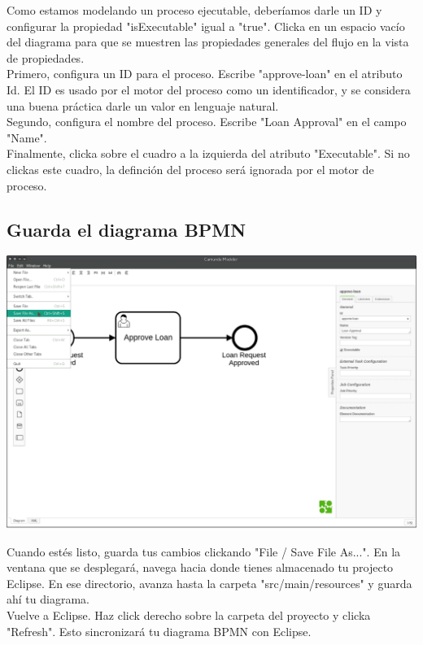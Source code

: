 \documentclass{article}
\begin{document}
Como estamos modelando un proceso ejecutable, deberíamos darle un ID y configurar la propiedad "isExecutable" igual a "true". Clicka en un espacio vacío del diagrama para que se muestren las propiedades generales del flujo en la vista de propiedades.\\
Primero, configura un ID para el proceso. Escribe "approve-loan" en el atributo Id. El ID es usado por el motor del proceso como un identificador, y se considera una buena práctica darle un valor en lenguaje natural.\\
Segundo, configura el nombre del proceso. Escribe "Loan Approval" en el campo "Name".\\
Finalmente, clicka sobre el cuadro a la izquierda del atributo "Executable". Si no clickas este cuadro, la definción del proceso será ignorada por el motor de proceso.

\subsection{Guarda el diagrama BPMN}

\begin{center}
\includegraphics[width=\textwidth]{modeler-save-diagram.png}
\end{center}

Cuando estés listo, guarda tus cambios clickando "File / Save File As...". En la ventana que se desplegará, navega hacia donde tienes almacenado tu projecto Eclipse. En ese directorio, avanza hasta la carpeta "src/main/resources" y guarda ahí tu diagrama.\\
Vuelve a Eclipse. Haz click derecho sobre la carpeta del proyecto y clicka "Refresh". Esto sincronizará tu diagrama BPMN con Eclipse.
\end{document}
